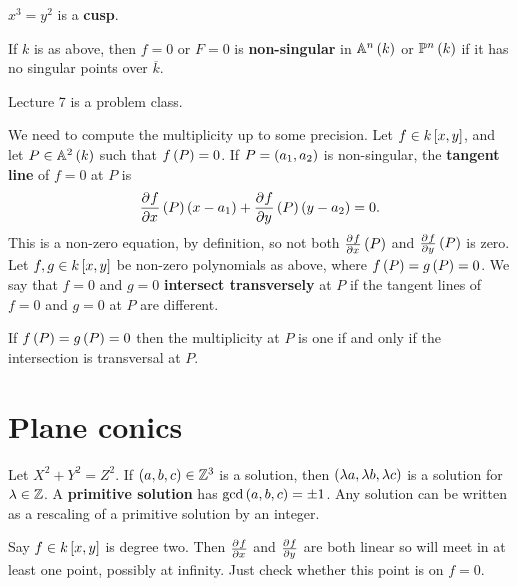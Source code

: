 \begin{example*}
$ x^3 = y^2 $ is a \textbf{cusp}.
\end{example*}

\begin{definition}
If $ k $ is as above, then $ f = 0 $ or $ F = 0 $ is \textbf{non-singular} in $ \AA^n\br{k} $ or $ \PP^n\br{k} $ if it has no singular points over $ \overline{k} $.
\end{definition}


Lecture 7 is a problem class.


We need to compute the multiplicity up to some precision. Let $ f \in k\sbr{x, y} $, and let $ P \in \AA^2\br{k} $ such that $ f\br{P} = 0 $. If $ P = \br{a_1, a_2} $ is non-singular, the \textbf{tangent line} of $ f = 0 $ at $ P $ is
$$ \dpd{f}{x}\br{P}\br{x - a_1} + \dpd{f}{y}\br{P}\br{y - a_2} = 0. $$
This is a non-zero equation, by definition, so not both $ \tpd{f}{x}\br{P} $ and $ \tpd{f}{y}\br{P} $ is zero. Let $ f, g \in k\sbr{x, y} $ be non-zero polynomials as above, where $ f\br{P} = g\br{P} = 0 $. We say that $ f = 0 $ and $ g = 0 $ \textbf{intersect transversely} at $ P $ if the tangent lines of $ f = 0 $ and $ g = 0 $ at $ P $ are different.

\begin{theorem}
If $ f\br{P} = g\br{P} = 0 $ then the multiplicity at $ P $ is one if and only if the intersection is transversal at $ P $.
\end{theorem}

\pagebreak

\section{Plane conics}

Let $ X^2 + Y^2 = Z^2 $. If $ \br{a, b, c} \in \ZZ^3 $ is a solution, then $ \br{\lambda a, \lambda b, \lambda c} $ is a solution for $ \lambda \in \mathbb{Z} $. A \textbf{primitive solution} has $ \gcd\br{a, b, c} = \pm 1 $. Any solution can be written as a rescaling of a primitive solution by an integer.

\begin{algorithm}
Say $ f \in k\sbr{x, y} $ is degree two. Then $ \tpd{f}{x} $ and $ \tpd{f}{y} $ are both linear so will meet in at least one point, possibly at infinity. Just check whether this point is on $ f = 0 $.
\end{algorithm}

